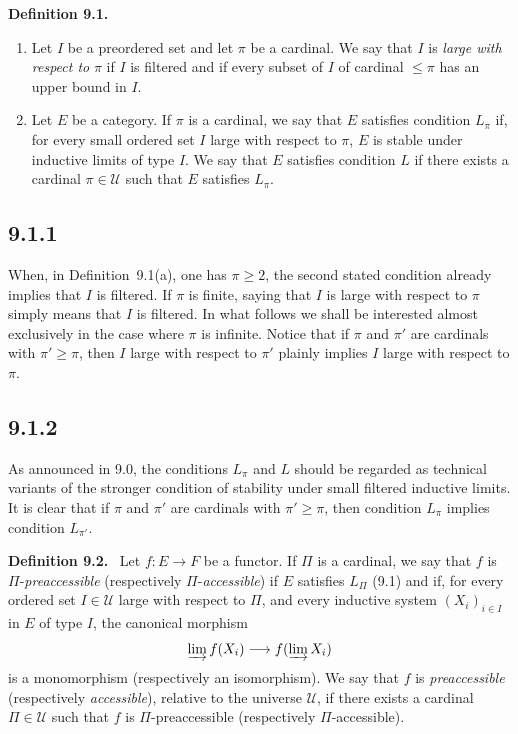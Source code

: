 \documentclass[11pt]{article}
\newcommand{\U}{\mathcal{U}}
\newenvironment{statement}[1]{\par\medskip\noindent\textbf{#1.}\ }{\par\medskip}
\begin{document}
\begin{statement}{Definition 9.1}
\begin{enumerate}[label=\alph*)]
\item Let $I$ be a preordered set and let $\pi$ be a cardinal. We say that $I$ is \emph{large with respect to} $\pi$ if $I$ is filtered and if every subset of $I$ of cardinal $\leq \pi$ has an upper bound in $I$.

\item Let $E$ be a category. If $\pi$ is a cardinal, we say that $E$ satisfies condition $L_\pi$ if, for every small ordered set $I$ large with respect to $\pi$, $E$ is stable under inductive limits of type $I$. We say that $E$ satisfies condition $L$ if there exists a cardinal $\pi\in\U$ such that $E$ satisfies $L_\pi$.
\end{enumerate}
\end{statement}

\subsection*{9.1.1}
When, in Definition~9.1(a), one has $\pi\geq 2$, the second stated condition already implies that $I$ is filtered. If $\pi$ is finite, saying that $I$ is large with respect to $\pi$ simply means that $I$ is filtered. In what follows we shall be interested almost exclusively in the case where $\pi$ is infinite. Notice that if $\pi$ and $\pi'$ are cardinals with $\pi'\geq \pi$, then $I$ large with respect to $\pi'$ plainly implies $I$ large with respect to $\pi$.

\subsection*{9.1.2}
As announced in 9.0, the conditions $L_\pi$ and $L$ should be regarded as technical variants of the stronger condition of stability under small filtered inductive limits. It is clear that if $\pi$ and $\pi'$ are cardinals with $\pi'\geq \pi$, then condition $L_\pi$ implies condition $L_{\pi'}$.

\begin{statement}{Definition 9.2}
Let $f:E\to F$ be a functor. If $\Pi$ is a cardinal, we say that $f$ is $\Pi$-\emph{preaccessible} (respectively $\Pi$-\emph{accessible}) if $E$ satisfies $L_\Pi$ (9.1) and if, for every ordered set $I\in\U$ large with respect to $\Pi$, and every inductive system $(X_i)_{i\in I}$ in $E$ of type $I$, the canonical morphism
\[
 \varinjlim f(X_i)\longrightarrow f(\varinjlim X_i)
\]
is a monomorphism (respectively an isomorphism). We say that $f$ is \emph{preaccessible} (respectively \emph{accessible}), relative to the universe $\U$, if there exists a cardinal $\Pi\in\U$ such that $f$ is $\Pi$-preaccessible (respectively $\Pi$-accessible).
\end{statement}
\end{document}
